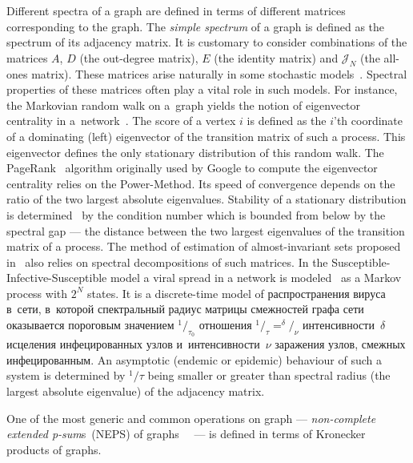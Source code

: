 \documentclass[14pt,a4paper]{extarticle}
\theoremstyle{definition}
\begin{document}
Different spectra of a graph are defined in terms of different matrices
    corresponding to the graph.
The \emph{simple spectrum} of a graph
    is defined as the spectrum of its adjacency matrix.
It is customary to consider combinations
    of the matrices \( A \),
    \( D \) (the out-degree matrix),
    \( E \) (the identity matrix)
    and \( \mathcal{J}_N \) (the all-ones matrix).
These matrices arise naturally
    in some stochastic models~\cite[p.~184]{cvetkovic2010introduction}.
Spectral  properties of these matrices
    often play a vital role in such models.
For instance, the Markovian random walk on a~graph
    yields the notion of eigenvector centrality
    in a~network~\cite{ilprints422,bonacich1972factoring}.
The score of a vertex \( i \)
    is defined as the \( i \)'th coordinate
    of a dominating (left) eigenvector
    of the transition matrix of such a process.
This eigenvector
    defines the only stationary distribution
    of this random walk.
The PageRank~\cite{ilprints422} algorithm
    originally used by Google
    to compute the eigenvector centrality
    relies on the Power-Method.
Its speed of convergence depends on
    the ratio of the two largest absolute eigenvalues.
Stability of a stationary distribution
    is determined~\cite{meyer1994sensitivity}
    by the condition number
    which is bounded from below
    by the spectral gap --- the distance between
    the two largest eigenvalues
    of the transition matrix of a process.
The method of estimation of almost-invariant sets
    proposed in~\cite{schwartz2006fluctuation}
    also relies on spectral decompositions of such matrices.
In the Susceptible-Infective-Susceptible model
    a viral spread in a network
    is modeled~\cite{wang2003epidemic,chakrabarti2008epidemic} as a Markov process
    with \( 2^N \) states.
It is a discrete-time model of
распространения вируса в~сети, в~которой спектральный радиус матрицы смежностей
графа сети  оказывается пороговым значением \( ^1/_{\tau_0} \) отношения
\( ^1/_\tau = ^\delta/_\nu \) интенсивности~\( \delta \) исцеления
инфецированных узлов и~интенсивности~\( \nu \) заражения узлов, смежных
инфецированным. 
An asymptotic (endemic or epidemic) behaviour of such a system
    is determined by \(^1/\tau\) being smaller or greater than
    spectral radius (the largest absolute eigenvalue)
    of the adjacency matrix.

One of the most generic and common operations on graph --- 
    \emph{non-complete extended p-sum}s~(NEPS) of
    graphs~\cite[p.~44]{cvetkovic2010introduction}~\cite{cvetkovic1997eigenspaces}
    --- is defined in terms of Kronecker products of graphs.
\end{document}
